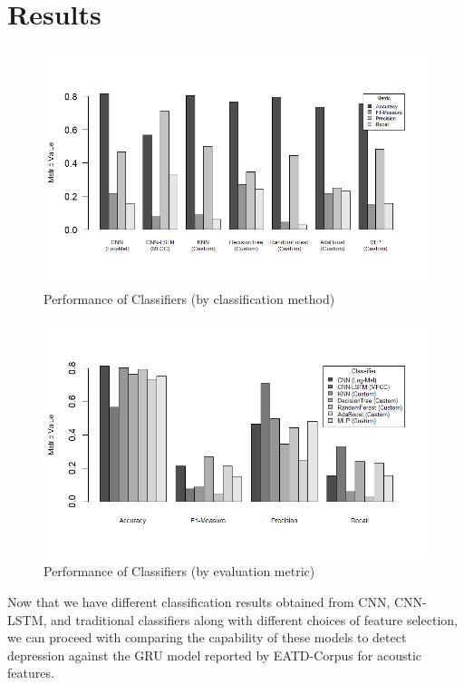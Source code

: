 
\section{Results}\label{sec:results}



\begin{figure}[!t]
    \centerline{\includegraphics[width=\columnwidth]{images/perf-classifier.png}}
    \caption{Performance of Classifiers (by classification method)}
    \label{fig:perf:classifier}
\end{figure}

\begin{figure}[!t]
    \centerline{\includegraphics[width=\columnwidth]{images/perf-metric.png}}
    \caption{Performance of Classifiers (by evaluation metric)}
    \label{fig:perf:metric}
\end{figure}

Now that we have different classification results obtained from CNN, CNN-LSTM, and traditional classifiers along with different choices of feature selection, we can proceed with comparing the capability of these models to detect depression against the GRU model reported by EATD-Corpus for acoustic features.

